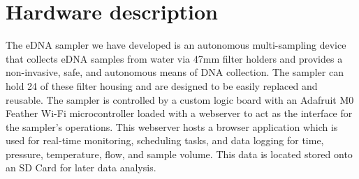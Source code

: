 \documentclass[11pt, letterpaper]{article}
\begin{document}
\section{Hardware description}

The eDNA sampler we have developed is an autonomous multi-sampling device that collects eDNA samples from water via 47mm filter holders and provides a non-invasive, safe, and autonomous means of DNA collection. The sampler can hold 24 of these filter housing and are designed to be easily replaced and reusable. The sampler is controlled by a custom logic board with an Adafruit M0 Feather Wi-Fi microcontroller loaded with a webserver to act as the interface for the sampler’s operations. This webserver hosts a browser application which is used for real-time monitoring, scheduling tasks, and data logging for time, pressure, temperature, flow, and sample volume. This data is located stored onto an SD Card for later data analysis. 
\end{document}
